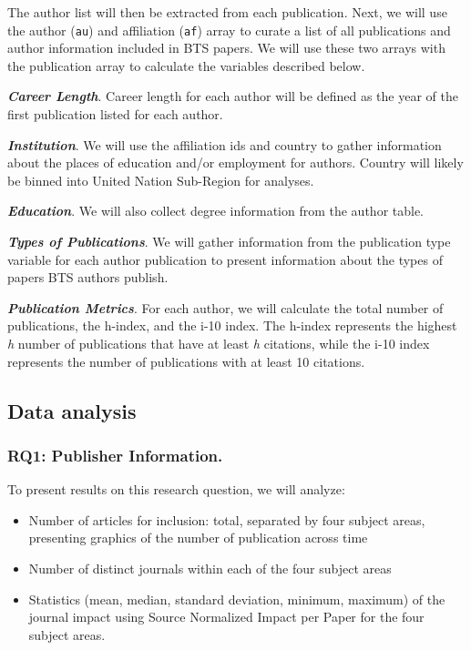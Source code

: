 \documentclass[
  man]{apa7}
\providecommand{\tightlist}{%
  \setlength{\itemsep}{0pt}\setlength{\parskip}{0pt}}
\begin{document}
The author list will then be extracted from each publication. Next, we
will use the author (\texttt{au}) and affiliation (\texttt{af}) array to curate a list
of all publications and author information included in BTS papers. We
will use these two arrays with the publication array to calculate the
variables described below.

\textbf{\emph{Career Length}}. Career length for each author will be defined as
the year of the first publication listed for each author.

\textbf{\emph{Institution}}. We will use the affiliation ids and country to gather
information about the places of education and/or employment for authors.
Country will likely be binned into United Nation Sub-Region for
analyses.

\textbf{\emph{Education}}. We will also collect degree information from the author
table.

\textbf{\emph{Types of Publications}}. We will gather information from the
publication type variable for each author publication to present
information about the types of papers BTS authors publish.

\textbf{\emph{Publication Metrics}}. For each author, we will calculate the total
number of publications, the h-index, and the i-10 index. The h-index
represents the highest \emph{h} number of publications that have at least \emph{h}
citations, while the i-10 index represents the number of publications
with at least 10 citations.

\hypertarget{data-analysis}{%
\subsection{Data analysis}\label{data-analysis}}

\hypertarget{rq1-publisher-information.-1}{%
\subsubsection{RQ1: Publisher Information.}\label{rq1-publisher-information.-1}}

To present results on this research question, we will analyze:

\begin{itemize}
\tightlist
\item
  Number of articles for inclusion: total, separated by four subject
  areas, presenting graphics of the number of publication across time
\item
  Number of distinct journals within each of the four subject areas
\item
  Statistics (mean, median, standard deviation, minimum, maximum) of
  the journal impact using Source Normalized Impact per Paper for the
  four subject areas.
\end{itemize}
\end{document}
